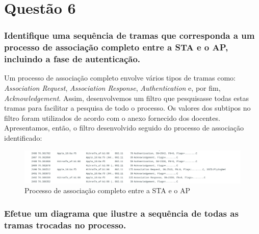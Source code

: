 

\section{Questão 6}



\subsubsection{Identifique uma sequência de tramas que corresponda a um processo de associação completo entre a STA e o AP, incluindo a fase de autenticação.}

    \par Um processo de associação completo envolve vários tipos de tramas como: \textit{Association Request}, \textit{Association Response}, \textit{Authentication} e, por fim, \textit{Acknowledgement}. Assim, desenvolvemos um filtro que pesquisasse todas estas tramas para facilitar a pesquisa de todo o processo. Os valores dos subtipos no filtro foram utilizados de acordo com o anexo fornecido dos docentes. Apresentamos, então, o filtro desenvolvido seguido do processo de associação identificado:
    
    \vspace{10pt}
    \begin{minipage}{\linewidth}
        \centering
    \end{minipage}

    \begin{figure}[H]
        \centering
        \includegraphics[width=500pt]{Prints/Questao6/rc1.png}
        \caption{Processo de associação completo entre a STA e o AP} \label{questao6-1}
    \end{figure}








\subsubsection{Efetue um diagrama que ilustre a sequência de todas as tramas trocadas no processo.}

